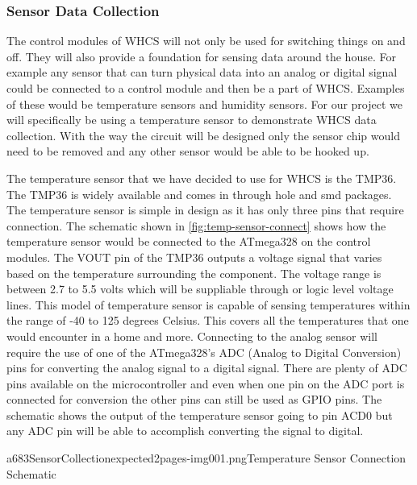 \subsubsection{Sensor Data Collection}
The control modules of WHCS will not only be used for switching things on and
off. They will also provide a foundation for sensing data around the house. For
example any sensor that can turn physical data into an analog or digital signal
could be connected to a control module and then be a part of WHCS. Examples of
these would be temperature sensors and humidity sensors. For our project we
will specifically be using a temperature sensor to demonstrate WHCS data
collection. With the way the circuit will be designed only the sensor chip
would need to be removed and any other sensor would be able to be hooked up.

The temperature sensor that we have decided to use for WHCS is the TMP36. The
TMP36 is widely available and comes in through hole and smd packages. The
temperature sensor is simple in design as it has only three pins that require
connection. The schematic shown in \autoref{fig:temp-sensor-connect} shows how the
temperature sensor would be connected to the ATmega328 on the control modules.
The VOUT pin of the TMP36 outputs a voltage signal that varies based on the
temperature surrounding the component. The voltage range is between 2.7 to 5.5
volts which will be suppliable through or logic level voltage lines. This model
of temperature sensor is capable of sensing temperatures within the range of
{}-40 to 125 degrees Celsius. This covers all the temperatures that one would
encounter in a home and more. Connecting to the analog sensor will require the
use of one of the ATmega328's ADC (Analog to Digital Conversion) pins for
converting the analog signal to a digital signal. There are plenty of ADC pins
available on the microcontroller and even when one pin on the ADC port is
connected for conversion the other pins can still be used as GPIO pins. The
schematic shows the output of the temperature sensor going to pin ACD0 but any
ADC pin will be able to accomplish converting the signal to digital.

{a683SensorCollectionexpected2pages-img001.png}{Temperature Sensor Connection Schematic}

